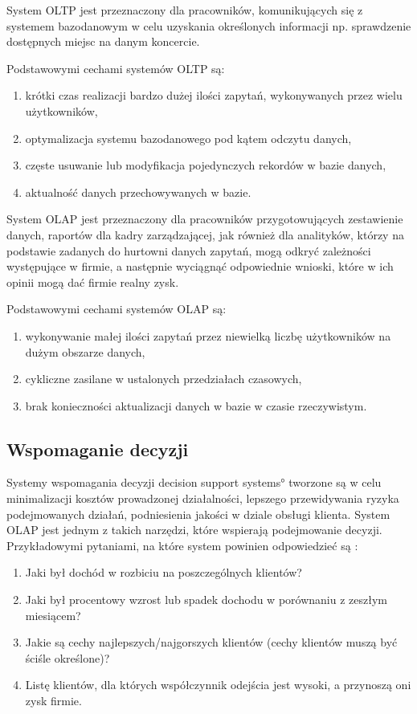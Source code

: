 System OLTP jest przeznaczony dla pracowników, komunikujących się 
 z systemem bazodanowym w celu uzyskania określonych informacji 
 np. sprawdzenie dostępnych miejsc na danym koncercie.

Podstawowymi cechami systemów OLTP są:
\begin{enumerate}
 \item krótki czas realizacji bardzo dużej ilości zapytań, wykonywanych przez wielu użytkowników\label{OLTP_1},
 \item optymalizacja systemu bazodanowego pod kątem odczytu danych,
 \item częste usuwanie lub modyfikacja pojedynczych rekordów w bazie danych,
 \item aktualność danych przechowywanych w bazie.
\end{enumerate}

System OLAP jest przeznaczony dla pracowników przygotowujących zestawienie danych,
 raportów dla kadry zarządzającej,
 jak również dla analityków, 
 którzy na podstawie zadanych do hurtowni danych zapytań,
 mogą odkryć zależności występujące w firmie, a następnie wyciągnąć odpowiednie wnioski,
 które w ich opinii mogą dać firmie realny zysk.
 
Podstawowymi cechami systemów OLAP są:
\begin{enumerate}
 \item wykonywanie małej ilości zapytań przez niewielką liczbę użytkowników na dużym obszarze danych,
 \item cykliczne zasilane w ustalonych przedziałach czasowych,
 \item brak konieczności aktualizacji danych w bazie w czasie rzeczywistym.
\end{enumerate}


\subsection{Wspomaganie decyzji }
Systemy wspomagania decyzji \ang{decision support systems} tworzone są 
 w celu minimalizacji kosztów prowadzonej działalności,
 lepszego przewidywania ryzyka podejmowanych działań, podniesienia jakości w dziale obsługi klienta.
System OLAP jest 
 jednym z takich narzędzi, które wspierają podejmowanie decyzji.
Przykładowymi pytaniami, na które system powinien odpowiedzieć są \cite{TodMan}:
 \begin{enumerate}
  \item Jaki był dochód w rozbiciu na poszczególnych klientów?
  \item Jaki był procentowy wzrost lub spadek dochodu w porównaniu z zeszłym miesiącem?
  \item Jakie są cechy najlepszych/najgorszych klientów (cechy klientów muszą być ściśle określone)?
  \item Listę klientów, dla których współczynnik odejścia jest wysoki, a przynoszą oni zysk firmie.
 
 \end{enumerate}

